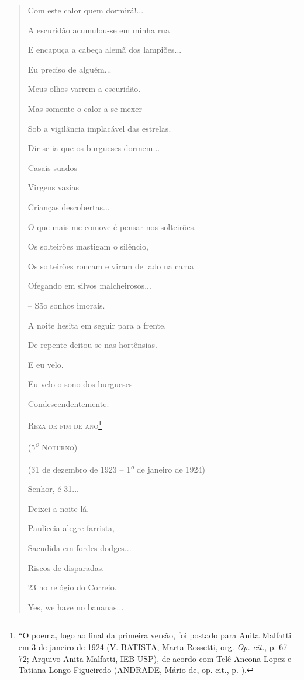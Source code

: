 \begin{verse}
Com este calor quem dormirá!...

A escuridão acumulou-se em minha rua

E encapuça a cabeça alemã dos lampiões...

Eu preciso de alguém...

Meus olhos varrem a escuridão.

Mas somente o calor a se mexer

Sob a vigilância implacável das estrelas.

Dir-se-ia que os burgueses dormem...

Casais suados

Virgens vazias

Crianças descobertas...

O que mais me comove é pensar nos solteirões.

Os solteirões mastigam o silêncio,

Os solteirões roncam e viram de lado na cama

Ofegando em silvos malcheirosos...

-- São sonhos imorais.

A noite hesita em seguir para a frente.

De repente deitou-se nas hortênsias.

E eu velo.

Eu velo o sono dos burgueses

Condescendentemente.

\textsc{Reza de fim de ano}\footnote{``O poema, logo ao final da
  primeira versão, foi postado para Anita Malfatti em 3 de janeiro de
  1924 (V. BATISTA, Marta Rossetti, org. \emph{Op. cit.}, p. 67-72;
  Arquivo Anita Malfatti, IEB-USP), de acordo com Telê Ancona Lopez e
  Tatiana Longo Figueiredo (ANDRADE, Mário de, op. cit., p. ).}

\textsc{(5\textsuperscript{\emph{o}} Noturno)}

(31 de dezembro de 1923 -- 1\textsuperscript{\emph{o}} de janeiro de
1924)

Senhor, é 31...

Deixei a noite lá.

Pauliceia alegre farrista,

Sacudida em fordes dodges...

Riscos de disparadas.

23 no relógio do Correio.

Yes, we have no bananas...


\end{verse}
